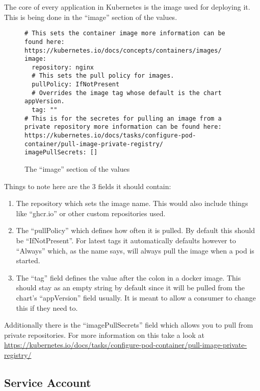 \documentclass[english,10pt]{scrbook}
\begin{document}
The core of every application in Kubernetes is the image used for deploying it.
This is being done in the \enquote{image} section of the  \gls{values}.

\begin{figure}[h]
\begin{verbatim}
# This sets the container image more information can be found here: https://kubernetes.io/docs/concepts/containers/images/
image:
  repository: nginx
  # This sets the pull policy for images.
  pullPolicy: IfNotPresent
  # Overrides the image tag whose default is the chart appVersion.
  tag: ""
# This is for the secretes for pulling an image from a private repository more information can be found here: https://kubernetes.io/docs/tasks/configure-pod-container/pull-image-private-registry/
imagePullSecrets: []
\end{verbatim}
\caption{The \enquote{image} section of the \gls{values}}\label{code:image_section}
\end{figure}

Things to note here are the 3 fields it should contain:

\begin{enumerate}
	\item The repository which sets the image name. This would also include things like \enquote{ghcr.io} or other custom repositories used.
	\item The \enquote{pullPolicy} which defines how often it is pulled. By default this should be \enquote{IfNotPresent}. For latest tags it automatically defaults however to \enquote{Always} which, as the name says, will always pull the image when a pod is started.
	\item The \enquote{tag} field defines the value after the colon in a docker image. This should stay as an empty string by default since it will be pulled from the chart's \enquote{appVersion} field usually. It is meant to allow a consumer to change this if they need to.
\end{enumerate}

Additionally there is the \enquote{imagePullSecrets} field which allows you to pull from private repositories. For more information on this take a look at \url{https://kubernetes.io/docs/tasks/configure-pod-container/pull-image-private-registry/}
\clearpage

\subsection{Service Account}
\end{document}
